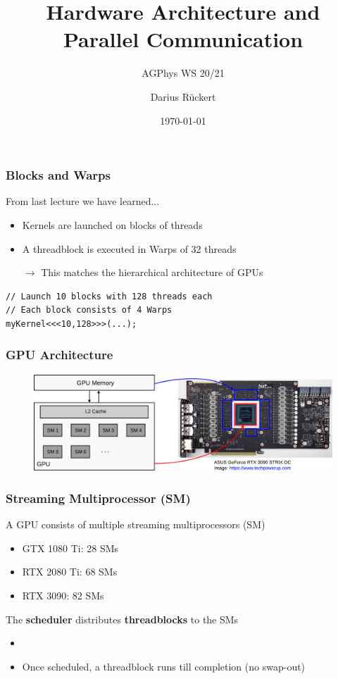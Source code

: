 \documentclass[aspectratio=169,handout]{beamer}
\subtitle{AGPhys WS 20/21}
\title{Hardware Architecture and Parallel Communication}
\author[Darius Rückert]{Darius Rückert}
\date{\today}
\begin{document}
\frame
{
	\titlepage
}


\begin{frame}[fragile]
	\frametitle{Blocks and Warps}
	From last lecture we have learned...
	\begin{itemize}
		\item Kernels are launched on blocks of threads
		\item A threadblock is executed in Warps of 32 threads
		\item [$\rightarrow$] This matches the hierarchical architecture of GPUs
	\end{itemize}
	
\begin{lstlisting}
// Launch 10 blocks with 128 threads each
// Each block consists of 4 Warps
myKernel<<<10,128>>>(...);
\end{lstlisting}
	
\end{frame}

\frame
{
	\frametitle{GPU Architecture}
	\begin{figure}
		\includegraphics[width=1.0\textwidth]{arch}
	\end{figure}
}

\begin{frame}[fragile]
	\frametitle{Streaming Multiprocessor (SM)}
	A GPU consists of multiple streaming multiprocessors (SM)
	\begin{itemize}
		\item GTX 1080 Ti: 28 SMs
		\item RTX 2080 Ti: 68 SMs
		\item RTX 3090: 82 SMs
	\end{itemize}
	The \textbf{scheduler} distributes \textbf{threadblocks} to the SMs
		\begin{itemize}
		\item 
			\item Once scheduled, a threadblock runs till completion (no swap-out)
		\end{itemize}
\end{frame}
\end{document}
